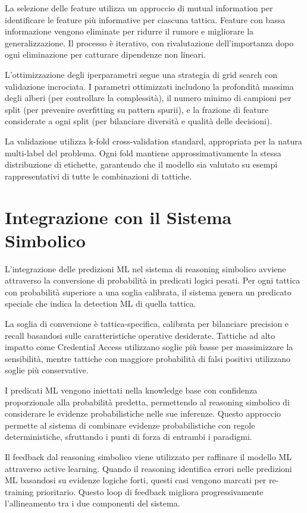 \documentclass[12pt,a4paper]{report}
\theoremstyle{definition}
\begin{document}
La selezione delle feature utilizza un approccio di mutual information per identificare le feature più informative per ciascuna tattica. Feature con bassa informazione vengono eliminate per ridurre il rumore e migliorare la generalizzazione. Il processo è iterativo, con rivalutazione dell'importanza dopo ogni eliminazione per catturare dipendenze non lineari.

L'ottimizzazione degli iperparametri segue una strategia di grid search con validazione incrociata. I parametri ottimizzati includono la profondità massima degli alberi (per controllare la complessità), il numero minimo di campioni per split (per prevenire overfitting su pattern spurii), e la frazione di feature considerate a ogni split (per bilanciare diversità e qualità delle decisioni).

La validazione utilizza k-fold cross-validation standard, appropriata per la natura multi-label del problema. Ogni fold mantiene approssimativamente la stessa distribuzione di etichette, garantendo che il modello sia valutato su esempi rappresentativi di tutte le combinazioni di tattiche.

\section{Integrazione con il Sistema Simbolico}

L'integrazione delle predizioni ML nel sistema di reasoning simbolico avviene attraverso la conversione di probabilità in predicati logici pesati. Per ogni tattica con probabilità superiore a una soglia calibrata, il sistema genera un predicato speciale che indica la detection ML di quella tattica.

La soglia di conversione è tattica-specifica, calibrata per bilanciare precision e recall basandosi sulle caratteristiche operative desiderate. Tattiche ad alto impatto come Credential Access utilizzano soglie più basse per massimizzare la sensibilità, mentre tattiche con maggiore probabilità di falsi positivi utilizzano soglie più conservative.

I predicati ML vengono iniettati nella knowledge base con confidenza proporzionale alla probabilità predetta, permettendo al reasoning simbolico di considerare le evidenze probabilistiche nelle sue inferenze. Questo approccio permette al sistema di combinare evidenze probabilistiche con regole deterministiche, sfruttando i punti di forza di entrambi i paradigmi.

Il feedback dal reasoning simbolico viene utilizzato per raffinare il modello ML attraverso active learning. Quando il reasoning identifica errori nelle predizioni ML basandosi su evidenze logiche forti, questi casi vengono marcati per re-training prioritario. Questo loop di feedback migliora progressivamente l'allineamento tra i due componenti del sistema.
\end{document}
